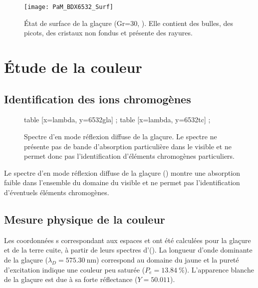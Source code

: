 \begin{figure}[htb]
  \texttt{[image: PaM\_BDX6532\_Surf]}
  \caption{\legendeE 
           État de surface de la glaçure (Gr=30, ). Elle contient des bulles, des 
           picots, des cristaux non fondus et présente des rayures.}
  \label{surf:6532}
\end{figure}


\section{Étude de la couleur}

\subsection{Identification des ions chromogènes}
\begin{figure}[htb]
  \begin{plotspectre}
       table [x=lambda, y=6532gla] {\gladata} ;
       table [x=lambda, y=6532tc] {\tcdata} ;
  \end{plotspectre}
  \caption{\legendeE 
           Spectre d'\AO en mode réflexion diffuse de la glaçure. Le spectre ne présente pas de bande d'absorption particulière dans le visible et ne permet donc pas l'identification d'éléments chromogènes particuliers.}
  \label{spectre:6532}
\end{figure}

Le spectre d'\AO en mode réflexion diffuse de la glaçure () montre une absorption faible dans l'ensemble du domaine du visible et ne permet pas l'identification d'éventuels éléments chromogènes.

\subsection{Mesure physique de la couleur}
Les coordonnées \trichro s correspondant aux espaces \Yxy et \Lab ont été calculées pour la glaçure et de la terre cuite, à partir de leurs spectres d'\AO (). La longueur d'onde dominante de la glaçure ($\lambda_D=\SI{575.30}{\nm}$) correspond au domaine du jaune \autocite{Kelly_1976} et la pureté d'excitation indique une couleur peu saturée ($P_e=\SI{13.84}{\percent}$). L'apparence blanche de la glaçure est due à sa forte réflectance ($Y=\num{50.011}$).


